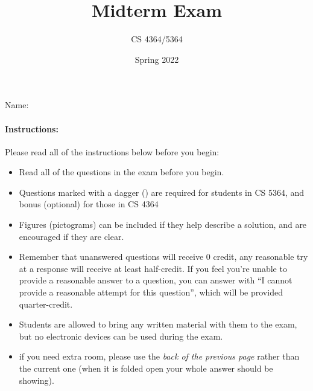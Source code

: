 \documentclass[11pt, oneside]{article}   	%
\title{Midterm Exam}
\author{CS 4364/5364}
\date{Spring 2022}							%
\begin{document}
\maketitle

\begin{center}
Name: \underline{ \hspace{20em} }
\end{center}
\paragraph{Instructions:}
Please read all of the instructions below before you begin:
\begin{itemize}
\item Read all of the questions in the exam before you begin. 
\item Questions marked with a dagger (\dag) are required for students in CS 5364, and bonus (optional) for those in CS 4364
\item Figures (pictograms) can be included if they help describe a solution, and are encouraged if they are clear. 
\item Remember that unanswered questions will receive 0 credit, any reasonable try at a response will receive at least half-credit. If you feel you're unable to provide a reasonable answer to a question, you can answer with ``I cannot provide a reasonable attempt for this question'', which will be provided quarter-credit. 
\item Students are allowed to bring any written material with them to the exam, but no electronic devices can be used during the exam. 
\item if you need extra room, please use the \emph{back of the previous page} rather than the current one (when it is folded open your whole answer should be showing). 
\end{itemize}
\end{document}

